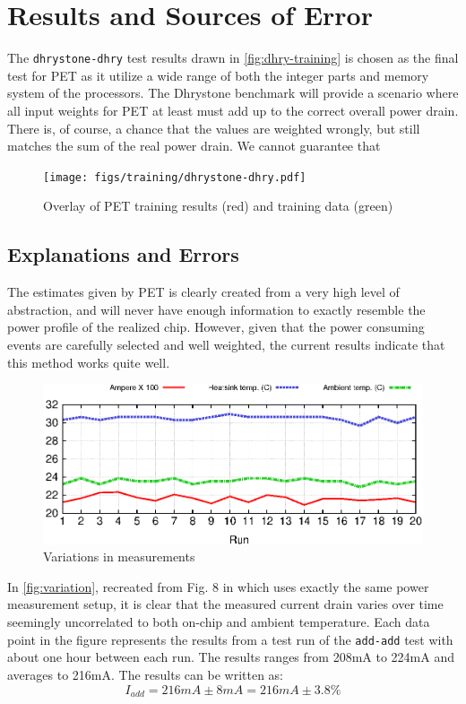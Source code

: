 \section{Results and Sources of Error}

The \texttt{dhrystone-dhry} test results drawn in \autoref{fig:dhry-training}
is chosen as the final test for PET as it utilize a wide range of both the
integer parts and memory system of the processors. The Dhrystone benchmark will
provide a scenario where all input weights for PET at least must add up to the correct
overall power drain. There is, of course, a chance that the values are weighted wrongly, but
still matches the sum of the real power drain. We cannot guarantee that 


\begin{figure}[ht]
\centering
\texttt{[image: figs/training/dhrystone-dhry.pdf]}
\caption{Overlay of PET training results (red) and training data (green)}
\label{fig:dhry-training}
\end{figure}

\subsection{Explanations and Errors}
The estimates given by PET is clearly created from a very high level of abstraction,
and will never have enough information to exactly resemble the power profile of
the realized chip. However, given that the power consuming events are carefully
selected and well weighted, the current results indicate that this method works quite well.

\begin{figure}[ht]
    \includegraphics{figs/heat}
    \caption{Variations in measurements}
    \label{fig:variation}
\end{figure}

In \autoref{fig:variation}, recreated from Fig. 8 in \cite{rundehvatum2013exploring} which uses exactly the
same power measurement setup, it is clear that the measured current drain varies over
time seemingly uncorrelated to both on-chip and ambient temperature. Each data point
in the figure represents the results from a test run of the \texttt{add-add} test with
about one hour between each run. The results ranges from 208mA to 224mA and averages to 216mA.
The results can be written as:
\[I_{add} = 216mA\pm8mA = 216mA\pm3.8\%\]

